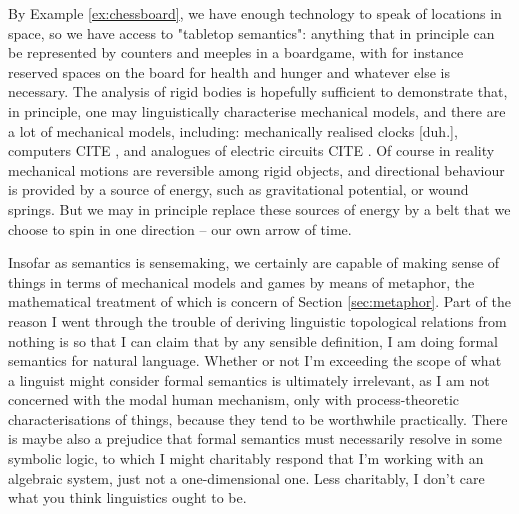  By Example \ref{ex:chessboard}, we have enough technology to speak of locations in space, so we have access to "tabletop semantics": anything that in principle can be represented by counters and meeples in a boardgame, with for instance reserved spaces on the board for health and hunger and whatever else is necessary. The analysis of rigid bodies is hopefully sufficient to demonstrate that, in principle, one may linguistically characterise mechanical models, and there are a lot of mechanical models, including: mechanically realised clocks [duh.], computers \bR CITE \e, and analogues of electric circuits \bR CITE \e. Of course in reality mechanical motions are reversible among rigid objects, and directional behaviour is provided by a source of energy, such as gravitational potential, or wound springs. But we may in principle replace these sources of energy by a belt that we choose to spin in one direction -- our own arrow of time.

 Insofar as semantics is sensemaking, we certainly are capable of making sense of things in terms of mechanical models and games by means of metaphor, the mathematical treatment of which is concern of Section \ref{sec:metaphor}. Part of the reason I went through the trouble of deriving linguistic topological relations from nothing is so that I can claim that by any sensible definition, I am doing formal semantics for natural language. Whether or not I'm exceeding the scope of what a linguist might consider formal semantics is ultimately irrelevant, as I am not concerned with the modal human mechanism, only with process-theoretic characterisations of things, because they tend to be worthwhile practically. There is maybe also a prejudice that formal semantics must necessarily resolve in some symbolic logic, to which I might charitably respond that I'm working with an algebraic system, just not a one-dimensional one. Less charitably, I don't care what you think linguistics ought to be.

\newpage

